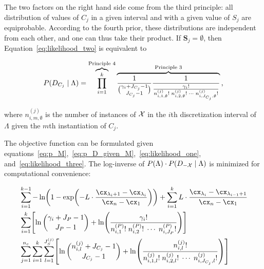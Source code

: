 The two factors on the right hand side come from the third principle: all distribution of values of $C_j$ in a given interval and with a given value of $S_j$ are equiprobable.
According to the fourth prior, these distributions are independent from each other, and one can thus take their product.
If $\bm{S}_j = \emptyset$, then Equation~\ref{eq:likelihood_two} is equivalent to

\begin{equation}
  \label{eq:likelihood_three}
  P(D_{C_j} \mid \Lambda) =
  \overbrace{\prod_{i=1}^{k}}^{\text{Principle 4}}
  \overbrace{{
    {1}\over{
      {\gamma_i + J_{C_j} - 1}\choose{J_{C_j}-1}}
    }
    {{1}\over{
      {{\gamma_i}!} \over {
        {n^{(j)}_{i,1,\emptyset}!} \; {n^{(j)}_{i,2,\emptyset}!} \; \cdots \; {n^{(j)}_{i,J_{C_j},\emptyset} !}
      }
    }
  }}^{\text{Principle 3}}
  \text{,}
\end{equation}

\noindent
where $n^{(j)}_{i,m,\emptyset}$ is the number of instances of $\mathcal{X}$ in the $i$th discretization interval of $\Lambda$ given the $m$th instantiation of $C_j$.

The objective function can be formulated given equations~\ref{eq:p_M},~\ref{eq:p_D_given_M},~\ref{eq:likelihood_one}, and~\ref{eq:likelihood_three}.
The log-inverse of $P(\Lambda) \cdot P(D_{-\mathcal{X}} \mid \Lambda)$ is minimized for computational convenience:

\begin{equation}
\label{eq:opt_prob}
\begin{aligned}
  & \sum_{i=1}^{k-1}
   - \ln
    \paren{
      1 - \exp
      \paren{
        - L \cdot  \frac{
                         \cx_{\lambda_i +1} - \cx_{\lambda_i}
                       }{
                         \cx_n - \cx_1
                        }
      }
    }
      + \sum_{i=1}^{k}
      L \cdot \frac{\cx_{\lambda_{i}} - \cx_{\lambda_{i-1} + 1}}{\cx_n - \cx_1} \\
  & \sum_{i=1}^{k} \brock{
  \ln{{\gamma_i + J_P - 1}\choose{J_P - 1}}
  +{ \ln \paren{
        \frac{
          {\gamma_i}!
        }{
          {n^{({P})}_{i,1}}! \; {n^{({P})}_{i,2}}! \; \cdots \; {n^{({P})}_{i,J_P}}!
        }
      }}
  } \\
  & \sum_{j=1}^{n_c} \sum_{i=1}^k \sum_{l=1}^{J^{(j)}_S} \brock{
  { \ln
          {{n^{(j)}_{i,l} + J_{C_j} - 1}\choose{J_{C_j}-1}}}
    +
    \ln \paren{ {
          \frac{
            {n^{(j)}_{i,l}}!
          }{
            {n^{(j)}_{i,1,l}!} \; {n^{(j)}_{i,2,l}!} \; \cdots \; {n^{(j)}_{i,J_{C_j},l}!}
          }
        }
        } }
\end{aligned}
\end{equation}

